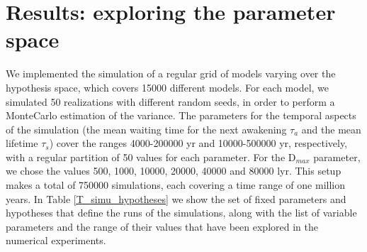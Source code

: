  

\section{Results: exploring the parameter space}\label{S_results}

We implemented the simulation of a regular grid of models varying over
the hypothesis space, which covers 15000 different models.
%
For each model, we simulated 50 realizations with different random
seeds, in order to perform a MonteCarlo estimation of the variance.
%
The parameters for the temporal aspects of the simulation (the mean
waiting time for the next awakening $\tau_a$ and the mean lifetime
$\tau_s$) cover the ranges 4000-200000 yr and 10000-500000 yr,
respectively, with a regular partition of 50 values for each
parameter.
%
For the D$_{max}$ parameter, we chose the values 500, 1000, 10000,
20000, 40000 and 80000 lyr.
%
This setup makes a total of 750000 simulations, each covering a time
range of one million years.
%
In Table \ref{T_simu_hypotheses} we show the set of fixed parameters
and hypotheses that define the runs of the simulations, along with the
list of variable parameters and the range of their values that have
been explored in the numerical experiments.


